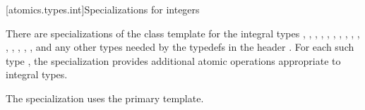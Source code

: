 [atomics.types.int]{Specializations for integers}

%
\pnum
There are specializations of the 
class template for the integral types
,
,
,
,
,
,
,
,
,
,
,
,
,
,
,
and any other types needed by the typedefs in the header .
For each such type , the specialization
 provides additional atomic operations appropriate to integral types.
\begin{note}
The specialization 
uses the primary template.
\end{note}

